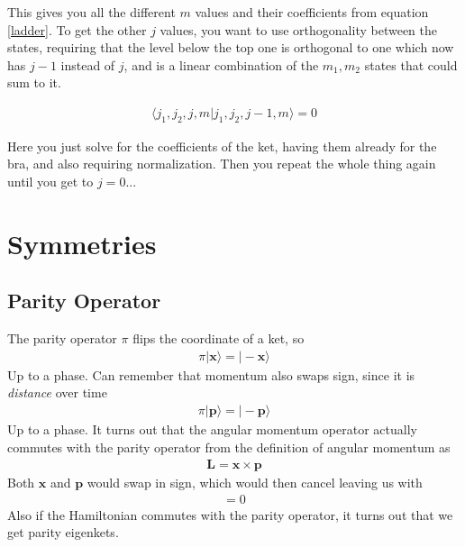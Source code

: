 This gives you all the different $m$ values and their coefficients from equation \ref{ladder}. To get the other $j$ values, you want to use orthogonality between the states, requiring that the level below the top one is orthogonal to one which now has $j-1$ instead of $j$, and is a linear combination of the $m_1,m_2$ states that could sum to it.

\begin{align}
\langle j_1,j_2, j, m|j_1,j_2,j-1,m\rangle = 0
\end{align}

Here you just solve for the coefficients of the ket, having them already for the bra, and also requiring normalization. Then you repeat the whole thing again until you get to $j=0$...




\section{Symmetries}


\subsection{Parity Operator}
The parity operator $\pi$ flips the coordinate of a ket, so
\begin{align}
\pi|\textbf{x}\rangle  = |-\textbf{x}\rangle
\end{align}
Up to a phase. Can remember that momentum also swaps sign, since it is \emph{distance} over time
\begin{align}
\pi|\textbf{p}\rangle = |-\textbf{p}\rangle
\end{align}
Up to a phase. It turns out that the angular momentum operator actually commutes with the parity operator from the definition of angular momentum as 
\begin{align}
\textbf{L} = \textbf{x}\times\textbf{p}
\end{align}
Both $\textbf{x}$ and $\textbf{p}$ would swap in sign, which would then cancel leaving us with
\begin{align}
[\textbf{L},\pi] = 0
\end{align}
Also if the Hamiltonian commutes with the parity operator, it turns out that we get parity eigenkets.




